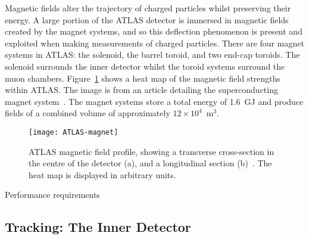 Magnetic fields alter the trajectory of charged particles whilst preserving
their energy. A large portion of the ATLAS detector is immersed in magnetic
fields created by the magnet systems, and so this deflection phenomenon is
present and exploited when making measurements of charged particles. There are
four magnet systems in ATLAS: the solenoid, the barrel toroid, and two end-cap
toroids. The solenoid surrounds the inner detector whilst the toroid systems
surround the muon chambers. Figure~\ref{fig:ATLAS-magnets} shows a heat map of
the magnetic field strengths within ATLAS. The image is from an article
detailing the superconducting magnet system~\cite{ATLAS-magnets}. The magnet
systems store a total energy of 1.6~GJ and produce fields of a combined volume
of approximately $12\times 10^4$~m$^3$.
\begin{figure}[ht] \centering \texttt{[image: ATLAS-magnet]}
  \caption[ATLAS magnetic field]{ATLAS magnetic field profile, showing a
transverse cross-section in the centre of the detector (a), and a longitudinal
section (b)~\cite{ATLAS-magnets}. The heat map is displayed in arbitrary
units.}%
  \label{fig:ATLAS-magnets}
\end{figure}

Performance requirements 


\subsection{Tracking: The Inner Detector}%
\label{sec:id}

